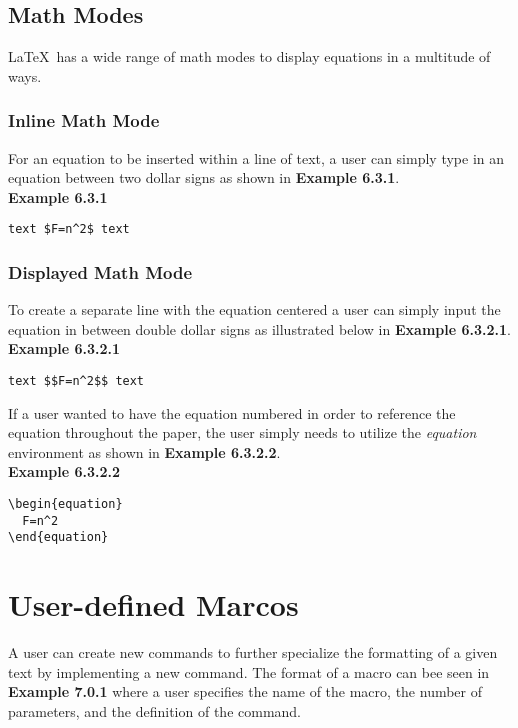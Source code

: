 \documentclass[11pt,twocolumn]{article}
\begin{document}
\subsection{Math Modes}
\par \LaTeX\ has a wide range of math modes to display equations in a multitude of ways.

\subsubsection{Inline Math Mode}

For an equation to be inserted within a line of text, a user can simply type in an equation between two dollar signs as shown in \textbf{Example 6.3.1}.\\

\noindent \textbf{Example 6.3.1}
\begin{verbatim}
text $F=n^2$ text
\end{verbatim}

\subsubsection{Displayed Math Mode}
To create a separate line with the equation centered a user can simply input the equation in between double dollar signs as illustrated below in \textbf{Example 6.3.2.1}.\\

\noindent \textbf{Example 6.3.2.1}
\begin{verbatim}
text $$F=n^2$$ text
\end{verbatim}

If a user wanted to have the equation numbered in order to reference the equation throughout the paper, the user simply needs to utilize the \textit{equation} environment as shown in \textbf{Example 6.3.2.2}.\\

\noindent \textbf{Example 6.3.2.2}
\begin{verbatim}
\begin{equation}
  F=n^2
\end{equation}
\end{verbatim}
\newpage
\section{User-defined Marcos}
A user can create new commands to further specialize the formatting of a given text by implementing a new command. The format of a macro can bee seen in \textbf{Example 7.0.1} where a user specifies the name of the macro, the number of parameters, and the definition of the command.\\
\end{document}
